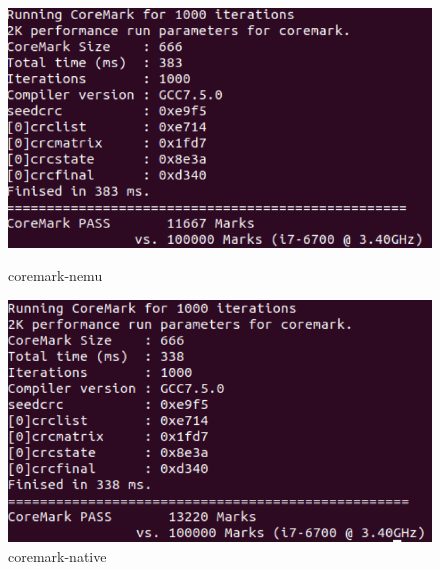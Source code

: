 \documentclass[UTF8,a4paper,10pt]{ctexart}
\begin{document}
{\begin{figure}[!h]
    \begin{minipage}[h]{0.5\linewidth}
    \centering
    \includegraphics[scale=0.25]{fig/14.png}
    \caption{coremark-nemu}
    \end{minipage}%
    \hfill
    \begin{minipage}[h]{0.5\linewidth}
    \centering
    \includegraphics[scale=0.25]{fig/15.png}
    \caption{coremark-native}
    \end{minipage}
\end{figure}

}
\end{document}

